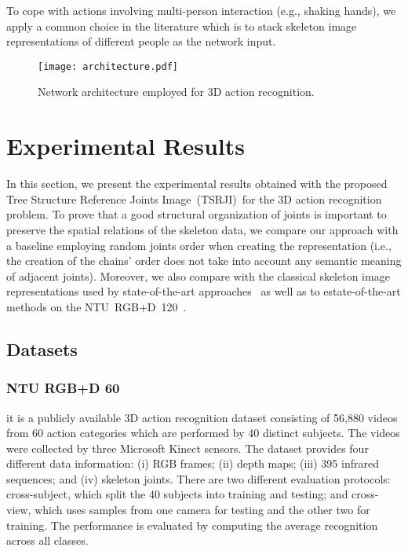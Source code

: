 \documentclass[10pt,conference]{IEEEtran}
\def\metodo{Tree Structure Reference Joints Image}
\def\sigla{TSRJI}
\def\metodosigla{\metodo~(\sigla)}
\begin{document}
To cope with actions involving multi-person interaction (e.g., shaking hands), we apply a common choice in the literature which is to stack skeleton image representations of different people as the network input.

\begin{figure*}[!t]
\centering
	\texttt{[image: architecture.pdf]}
	\caption{Network architecture employed for 3D action recognition.}
	\label{img:architecture}
\end{figure*}


\section{Experimental Results}\label{experiments}

In this section, we present the experimental results obtained with the proposed \metodosigla~for the 3D action recognition problem. To prove that a good structural organization of joints is important to preserve the spatial relations of the skeleton data, we compare our approach with a baseline employing random joints order when creating the representation (i.e., the creation of the chains' order  does not take into account any semantic meaning of adjacent joints). Moreover, we also compare with the classical skeleton image representations used by state-of-the-art approaches~\cite{Du:2015, Wang:2016, Ke:2017, Li:2017, Li:2018, Yang:2018} as well as to estate-of-the-art methods on the {NTU~RGB+D~120}~\cite{Liu:2019}.

\subsection{Datasets}

\subsubsection{NTU RGB+D 60~\cite{Shahroudy:2016}} it is a publicly available 3D action recognition dataset consisting of 56,880 videos from 60 action categories which are performed by 40 distinct subjects. The videos were collected by three Microsoft Kinect sensors. The dataset provides four different data information: (i) RGB frames; (ii) depth maps; (iii) 395 infrared sequences; and (iv) skeleton joints. There are two different evaluation protocols: cross-subject, which split the 40 subjects into training and testing; and cross-view, which uses samples from one camera for testing and the other two for training. The performance is evaluated by computing the average recognition across all classes.
\end{document}
